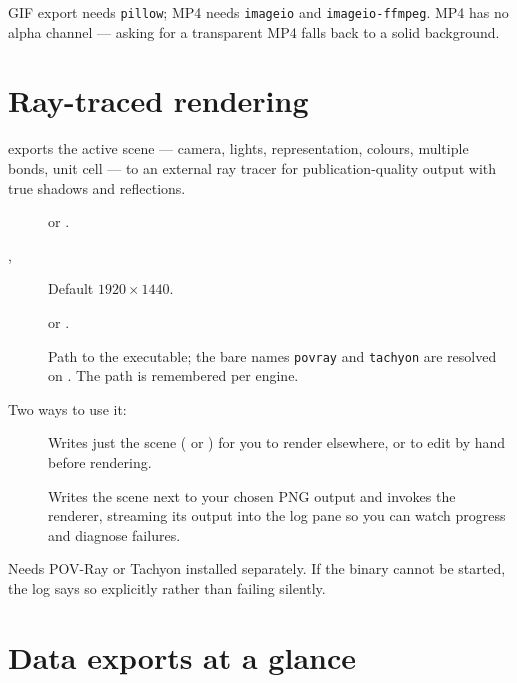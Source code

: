 \begin{calwarn}
GIF export needs \texttt{pillow}; MP4 needs \texttt{imageio} and
\texttt{imageio-ffmpeg}. MP4 has no alpha channel --- asking for a
transparent MP4 falls back to a solid background.
\end{calwarn}

\section{Ray-traced rendering}

\menusep{}\menusep{}
exports the active scene --- camera, lights, representation, colours,
multiple bonds, unit cell --- to an external ray tracer for
publication-quality output with true shadows and reflections.

\begin{description}
  \item[]  or .
  \item[, ] Default $1920 \times 1440$.
  \item[]  or .
  \item[] Path to the executable; the bare names
    \texttt{povray} and \texttt{tachyon} are resolved on . The
    path is remembered per engine.
\end{description}

Two ways to use it:

\begin{description}
  \item[] Writes just the scene
    ( or ) for you to render elsewhere, or to edit by
    hand before rendering.
  \item[] Writes the scene next to your chosen PNG output
    and invokes the renderer, streaming its output into the log pane so you
    can watch progress and diagnose failures.
\end{description}

\begin{calwarn}
Needs POV-Ray or Tachyon installed separately. If the binary cannot be
started, the log says so explicitly rather than failing silently.
\end{calwarn}

\section{Data exports at a glance}

